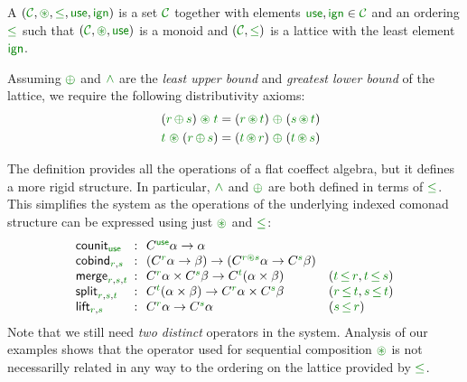 \begin{definition}
A \emph{} $(\C, \cseq, \cleq, \cunit, \czero)$ is a set 
$\C$ together with elements $\cunit, \czero \in \C$ and an ordering $\cleq$ such 
that $(\C, \cseq, \cunit)$ is a monoid and $(\C, \cleq)$ is a lattice with the least 
element $\czero$. 

Assuming $\cpar$ and $\czip$ are the \emph{least upper bound} and \emph{greatest lower bound}
of the lattice, we require the following distributivity axioms:
%
\begin{align*}
\quad (\cclrd{r}\, \cpar\, \cclrd{s}) \;\cseq\; \cclrd{t} & = (\cclrd{r} \,\cseq\, \cclrd{t}) \;\cpar\; (\cclrd{s}\, \cseq\, \cclrd{t}) \\
\quad \cclrd{t} \;\cseq\; (\cclrd{r}\, \cpar\, \cclrd{s}) & = (\cclrd{t} \,\cseq\, \cclrd{r}) \;\cpar\; (\cclrd{t}\, \cseq\, \cclrd{s})
\end{align*}
\end{definition}

\noindent
The definition provides all the operations of a flat coeffect algebra, but it defines a more rigid 
structure. In particular, $\czip$ and $\cpar$ are both defined in terms of $\cleq$. This simplifies 
the system as the operations of the underlying indexed comonad structure can be expressed using just
$\cseq$ and $\cleq$:
%
\begin{equation*}
\begin{array}{lcll}
 \ident{counit}_{\cunit} &\narrow{:}& 
    \ctyp{\cunit}{\alpha} \rightarrow \alpha \\
 \ident{cobind}_{\cclrd{r}, \cclrd{s}} &\narrow{:}& 
    (\ctyp{\cclrd{r}}{\alpha} \rightarrow \beta) \rightarrow (\ctyp{\cclrd{r}\cseq\cclrd{s}}{\alpha} \rightarrow \ctyp{\cclrd{s}}{\beta}) \\
\ident{merge}_{\cclrd{r},\cclrd{s},\cclrd{t}} &\narrow{:}& 
    \ctyp{\cclrd{r}}{\alpha} \times \ctyp{\cclrd{s}}{\beta} \rightarrow \ctyp{\cclrd{t}}{(\alpha \times \beta)} &
    (\cclrd{t}\,\cleq\,\cclrd{r}, \cclrd{t}\,\cleq\,\cclrd{s}) \\
\ident{split}_{\cclrd{r},\cclrd{s},\cclrd{t}} &\narrow{:}& 
    \ctyp{\cclrd{t}}{(\alpha \times \beta)} \rightarrow \ctyp{\cclrd{r}}{\alpha} \times \ctyp{\cclrd{s}}{\beta} &
    (\cclrd{r}\,\cleq\,\cclrd{t}, \cclrd{s}\,\cleq\,\cclrd{t}) \\
\ident{lift}_{\cclrd{r},\cclrd{s}} &\narrow{:}& 
    \ctyp{\cclrd{r}}{\alpha} \rightarrow \ctyp{\cclrd{s}}{\alpha} & 
    (\cclrd{s}\,\cleq\,\cclrd{r})
\end{array}
\end{equation*}
%
Note that we still need \emph{two distinct} operators in the system. Analysis of our examples shows
that the operator used for sequential composition $\cseq$ is not necessarilly related in any way to 
the ordering on the lattice provided by $\cleq$. 

